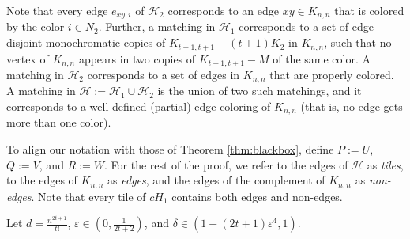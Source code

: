 \documentclass{article}
\theoremstyle{definition}
\newcommand\cH{{\mathcal H}}
\begin{document}
Note that every edge $e_{xy,i}$ of $\cH_2$ corresponds to an edge $xy \in K_{n,n}$ that is colored by the color $i \in N_2$. 
Further, a matching in $\cH_1$ corresponds to a set of edge-disjoint monochromatic copies of $K_{t+1, t+1}-(t+1)K_2$ in $K_{n,n}$,  such that no vertex of $K_{n,n}$ appears in two copies of $K_{t+1, t+1} - M$ of the same color. A matching in $\cH_2$ corresponds to a set of edges in $K_{n,n}$ that are properly colored. A matching in $\cH := \cH_1 \cup \cH_2$ is the union of two such matchings, and it corresponds to a well-defined (partial) edge-coloring of $K_{n,n}$ (that is, no edge gets more than one color). 

To align our notation with those of Theorem \ref{thm:blackbox}, define $P := U$, $Q := V$, and $R := W$.  For the rest of the proof, we refer to the edges of $\cH$ as \emph{tiles}, to the edges of $K_{n,n}$ as {\em edges}, and the edges of the complement of $K_{n,n}$ as {\em non-edges}. Note that every tile of $cH_1$ contains both edges and non-edges.  

Let $d = \frac{n^{2t+1}}{t!}$, $\varepsilon\in (0,\frac{1}{2t+2})$, and $\delta\in (1-(2t+1)\varepsilon^4,1)$.
\end{document}

